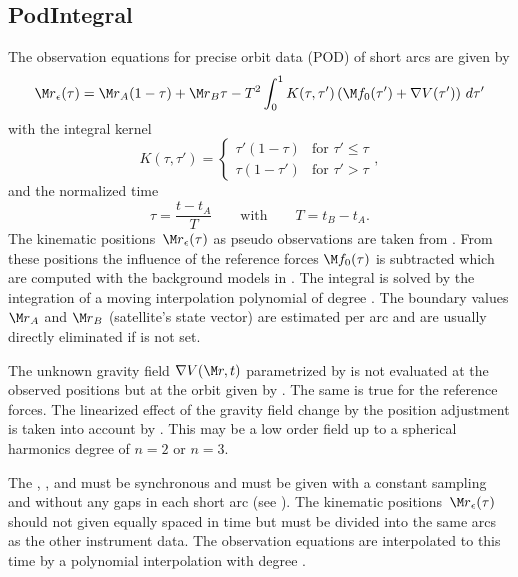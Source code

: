 \subsection{PodIntegral}\label{observationType:podIntegral}
The observation equations for precise orbit data (POD) of short arcs are given by
\begin{equation}
  {\M r}_\epsilon(\tau) = {\M r}_A(1-\tau) + {\M r}_B\tau - T^2\int_0^1 K(\tau,\tau')
  \left(\M f_0(\tau')+\nabla V(\tau')\right)\,d\tau'
\end{equation}
with the integral kernel
\begin{equation}
  K(\tau,\tau') = \begin{cases} \tau'(1-\tau) & \text{for }\tau'\le\tau \\
  \tau(1-\tau') & \text{for }\tau'>\tau \end{cases},
\end{equation}
and the normalized time
\begin{equation}
  \tau = \frac{t-t_A}{T}\qquad\text{with}\qquad T=t_B-t_A.
\end{equation}
The kinematic positions~${\M r}_\epsilon(\tau)$ as pseudo observations are taken from
. From these positions the influence of the reference forces $\M f_0(\tau)$
is subtracted which are computed with the background models in .
The integral is solved by the integration of a moving interpolation polynomial of degree .
The boundary values ${\M r}_A$ and ${\M r}_B$ (satellite's state vector) are estimated per arc
and are usually directly eliminated if  is not set.

The unknown gravity field $\nabla V(\M r, t)$ parametrized by 
is not evaluated at the observed positions but at the orbit given by .
The same is true for the reference forces. The linearized effect of the gravity field change by the position
adjustment is taken into account by . This may be a low order field up to a
spherical harmonics degree of $n=2$ or $n=3$.

The , , and 
must be synchronous and must be given with a constant sampling and without any gaps in each short arc
(see ).
The kinematic positions~${\M r}_\epsilon(\tau)$ should not given equally spaced in time
but must be divided into the same arcs as the other instrument data.
The observation equations are interpolated to this time by a polynomial interpolation
with degree .

